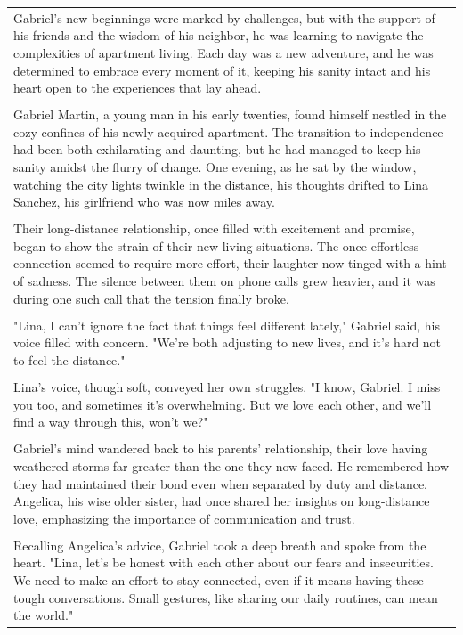 \begin{small}
\begin{longtable}{p{}}
\\
Gabriel's new beginnings were marked by challenges, but with the support of his friends and the wisdom of his neighbor, he was learning to navigate the complexities of apartment living. Each day was a new adventure, and he was determined to embrace every moment of it, keeping his sanity intact and his heart open to the experiences that lay ahead.
\\
\\
Gabriel Martin, a young man in his early twenties, found himself nestled in the cozy confines of his newly acquired apartment. The transition to independence had been both exhilarating and daunting, but he had managed to keep his sanity amidst the flurry of change. One evening, as he sat by the window, watching the city lights twinkle in the distance, his thoughts drifted to Lina Sanchez, his girlfriend who was now miles away.
\\
\\
Their long-distance relationship, once filled with excitement and promise, began to show the strain of their new living situations. The once effortless connection seemed to require more effort, their laughter now tinged with a hint of sadness. The silence between them on phone calls grew heavier, and it was during one such call that the tension finally broke.
\\
\\
"Lina, I can't ignore the fact that things feel different lately," Gabriel said, his voice filled with concern. "We're both adjusting to new lives, and it's hard not to feel the distance."
\\
\\
Lina's voice, though soft, conveyed her own struggles. "I know, Gabriel. I miss you too, and sometimes it's overwhelming. But we love each other, and we'll find a way through this, won't we?"
\\
\\
Gabriel's mind wandered back to his parents' relationship, their love having weathered storms far greater than the one they now faced. He remembered how they had maintained their bond even when separated by duty and distance. Angelica, his wise older sister, had once shared her insights on long-distance love, emphasizing the importance of communication and trust.
\\
\\
Recalling Angelica's advice, Gabriel took a deep breath and spoke from the heart. "Lina, let's be honest with each other about our fears and insecurities. We need to make an effort to stay connected, even if it means having these tough conversations. Small gestures, like sharing our daily routines, can mean the world."

\end{longtable}
\end{small}
